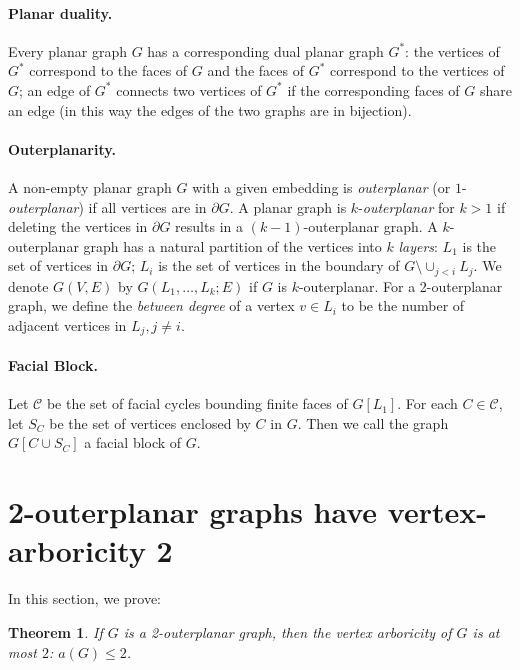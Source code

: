 \documentclass[11pt]{article}
\newtheorem{theorem}{Theorem}
\begin{document}
\paragraph{Planar duality.}

Every planar graph $G$ has a corresponding dual planar graph $G^*$:  the vertices of $G^*$ correspond to the faces of $G$ and the faces of $G^*$ correspond to the vertices of $G$; an edge of $G^*$ connects two vertices of $G^*$ if the corresponding faces of $G$ share an edge (in this way the edges of the two graphs are in bijection). %

\paragraph{Outerplanarity.}

A non-empty planar graph $G$ with a given embedding is \emph{outerplanar} (or $1$-\emph{outerplanar}) if all vertices are in $\partial G$. A planar graph is $k$-\emph{outerplanar} for $k > 1$ if deleting the vertices in $\partial G$ results in a $(k-1)$-outerplanar graph.  A $k$-outerplanar graph has a natural partition of the vertices into $k$ {\em layers}:  $L_1$ is the set of vertices in $\partial G$;  $L_i$ is the set of vertices in the boundary of $G \setminus \cup_{j < i} L_j$. We denote $G(V,E)$ by $G(L_1,\ldots, L_k; E)$ if $G$ is $k$-outerplanar. For a 2-outerplanar graph, we define the \emph{between degree} of a vertex $v \in L_i$ to be the number of adjacent vertices in $L_j, j \not= i$.

\paragraph{Facial Block.}  Let $\mathcal{C}$ be the set of facial cycles bounding finite faces of $G[L_1]$. For each $C \in \mathcal{C}$, let $S_C$ be the set of vertices enclosed by $C$ in $G$. Then we call the graph $G[C \cup S_C]$ a facial block of $G$. 

\section{2-outerplanar graphs have vertex-arboricity 2} \label{sec:2-2}

In this section, we prove:

\begin{theorem}\label{thm:2-arbor} 
If $G$ is a 2-outerplanar graph, then the vertex arboricity of $G$ is at most $2$: $a(G) \leq 2$.
\end{theorem}
\end{document}
